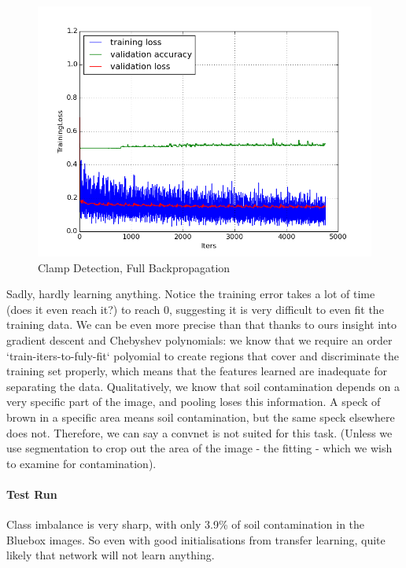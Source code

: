 \documentclass[a4paper,11pt]{article}
\begin{document}
\begin{figure}[h!]
	\centering
	\includegraphics[scale=0.5]{images/plot_soil_contam_noneC.png}
	\caption{Clamp Detection, Full Backpropagation}
\end{figure}

Sadly, hardly learning anything. Notice the training error takes a lot of time (does it even reach it?) to reach 0,  suggesting it is very difficult to even fit the training data. We can be even more precise than that thanks to ours insight into gradient descent and Chebyshev polynomials: we know that we require an order `train-iters-to-fuly-fit` polyomial to create regions that cover and discriminate the training set properly, which means that the features learned are inadequate for separating the data. Qualitatively, we know that soil contamination depends on a very specific part of the image, and pooling loses this information. A speck of brown in a specific area means soil contamination, but the same speck elsewhere does not. Therefore, we can say a convnet is not suited for this task. (Unless we use segmentation to crop out the area of the image - the fitting - which we wish to examine for contamination). \\

\paragraph{Test Run}

Class imbalance is very sharp, with only 3.9\% of soil contamination in the Bluebox images. So even with good initialisations from transfer learning, quite likely that network will not learn anything.
\end{document}
